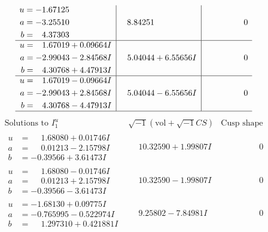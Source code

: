\documentclass[1p]{elsarticle_modified}
\theoremstyle{definition}
\newcommand{\I}{\sqrt{-1}}
\begin{document}
$$\begin{array}{c|c|c}
\begin{aligned}
u &= -1.67125\phantom{ +0.000000I} \\
a &= -3.25510\phantom{ +0.000000I} \\
b &= \phantom{-}4.37303\phantom{ +0.000000I}\end{aligned}
 & \phantom{-}8.84251\phantom{ +0.000000I} & \phantom{-0.000000 } 0 \\ \hline\begin{aligned}
u &= \phantom{-}1.67019 + 0.09664 I \\
a &= -2.99043 - 2.84568 I \\
b &= \phantom{-}4.30768 + 4.47913 I\end{aligned}
 & \phantom{-}5.04044 + 6.55656 I & \phantom{-0.000000 } 0 \\ \hline\begin{aligned}
u &= \phantom{-}1.67019 - 0.09664 I \\
a &= -2.99043 + 2.84568 I \\
b &= \phantom{-}4.30768 - 4.47913 I\end{aligned}
 & \phantom{-}5.04044 - 6.55656 I & \phantom{-0.000000 } 0\\
 \hline 
 \end{array}$$\newpage$$\begin{array}{c|c|c}  
\text{Solutions to }I^u_{1}& \I (\text{vol} + \sqrt{-1}CS) & \text{Cusp shape}\\
 \hline 
\begin{aligned}
u &= \phantom{-}1.68080 + 0.01746 I \\
a &= \phantom{-}0.01213 - 2.15798 I \\
b &= -0.39566 + 3.61473 I\end{aligned}
 & \phantom{-}10.32590 + 1.99807 I & \phantom{-0.000000 } 0 \\ \hline\begin{aligned}
u &= \phantom{-}1.68080 - 0.01746 I \\
a &= \phantom{-}0.01213 + 2.15798 I \\
b &= -0.39566 - 3.61473 I\end{aligned}
 & \phantom{-}10.32590 - 1.99807 I & \phantom{-0.000000 } 0 \\ \hline\begin{aligned}
u &= -1.68130 + 0.09775 I \\
a &= -0.765995 - 0.522974 I \\
b &= \phantom{-}1.297310 + 0.421881 I\end{aligned}
 & \phantom{-}9.25802 - 7.84981 I & \phantom{-0.000000 } 0 \\ \hline\begin{aligned}

\end{aligned}
\end{array}$$
\end{document}
